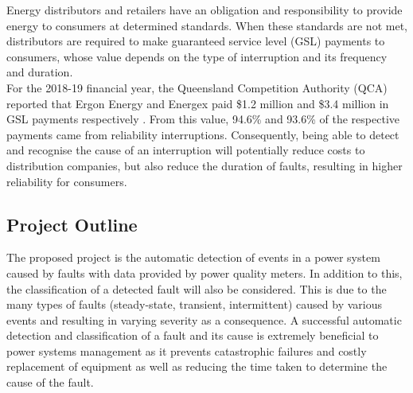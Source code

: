 \documentclass[12pt]{article}
\begin{document}
Energy distributors and retailers have an obligation and responsibility to provide energy to consumers at determined standards. When these standards are not met, distributors are required to make guaranteed service level (GSL) payments to consumers, whose value depends on the type of interruption and its frequency and duration. \newline
\\ 
For the 2018-19 financial year, the Queensland Competition Authority (QCA) reported that Ergon Energy and Energex paid \$1.2 million and \$3.4 million in GSL payments respectively \cite{QCA}. From this value, 94.6\% and 93.6\% of the respective payments came from reliability interruptions. Consequently, being able to detect and recognise the cause of an interruption will potentially reduce costs to distribution companies, but also reduce the duration of faults, resulting in higher reliability for consumers.



\newpage
\subsection{Project Outline}
The proposed project is the automatic detection of events in a power system caused by faults with data provided by power quality meters. In addition to this, the classification of a detected fault will also be considered. This is due to the many types of faults (steady-state, transient, intermittent) caused by various events and resulting in varying severity as a consequence. A successful automatic detection and classification of a fault and its cause is extremely beneficial to power systems management as it prevents catastrophic failures and costly replacement of equipment as well as reducing the time taken to  determine the cause of the fault.
\end{document}
